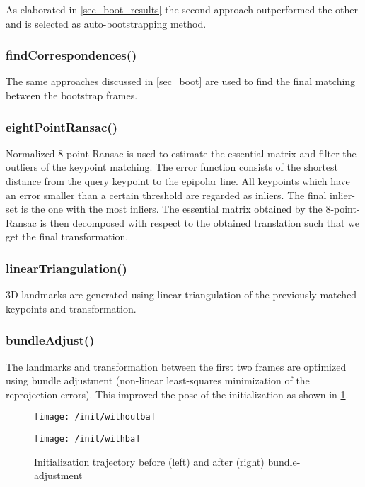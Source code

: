 As elaborated in \cref{sec_boot_results} the second approach outperformed the other and is selected as auto-bootstrapping method.


\subsubsection{findCorrespondences()}
The same approaches discussed in \cref{sec_boot} are used to find the final matching between the bootstrap frames.


\subsubsection{eightPointRansac()}
Normalized 8-point-Ransac is used to estimate the essential matrix and filter the outliers of the keypoint matching.
The error function consists of the shortest distance from the query keypoint to the epipolar line. All keypoints which have an error smaller than a certain threshold are regarded as inliers. The final inlier-set is the one with the most inliers.
The essential matrix obtained by the 8-point-Ransac is then decomposed with respect to the obtained translation such that we get the final transformation.

\subsubsection{linearTriangulation()}
3D-landmarks are generated using linear triangulation of the previously matched keypoints and transformation.

\subsubsection{bundleAdjust()}
The landmarks and transformation between the first two frames are optimized using bundle adjustment (non-linear least-squares minimization of the reprojection errors). This improved the pose of the initialization as shown in \cref{fig:ba_init}.
\begin{figure}[ht]
	\centering
	\begin{minipage}{.4\textwidth}
		\centering
		\texttt{[image: /init/withoutba]}
	\end{minipage}
	\begin{minipage}{.4\textwidth}
		\centering
		\texttt{[image: /init/withba]}
	\end{minipage}
	\caption{Initialization trajectory before (left) and after (right) bundle-adjustment}
	\label{fig:ba_init}
\end{figure}


